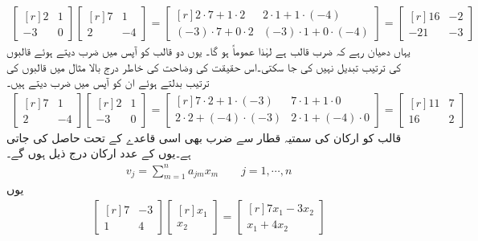 \begin{align*}
\begin{bmatrix*}[r]
2 & 1\\
-3 & 0
\end{bmatrix*}
\begin{bmatrix*}[r]
7 &1\\
2&-4
\end{bmatrix*}=
\begin{bmatrix*}[r]
2\cdot 7+1\cdot 2& 2 \cdot 1+1\cdot(-4)\\
(-3)\cdot 7+0\cdot 2& (-3)\cdot 1+0\cdot(-4)
\end{bmatrix*}=
\begin{bmatrix*}[r]
16&-2\\
-21&-3
\end{bmatrix*}
\end{align*}
یہاں دھیان رہے  کہ ضرب قالب  ہے لہٰذا  عموماً  ہو گا۔ یوں دو قالب کو آپس میں ضرب دیتے ہوئے  قالبوں کی ترتیب تبدیل نہیں کی جا سکتی۔اس حقیقت کی وضاحت کی خاطر درج بالا مثال میں قالبوں کی ترتیب بدلتے ہوئے ان کو آپس میں ضرب  دیتے ہیں۔
\begin{align*}
\begin{bmatrix*}[r]
7 & 1\\
2 & -4
\end{bmatrix*}
\begin{bmatrix*}[r]
2&1\\
-3&0
\end{bmatrix*}=
\begin{bmatrix*}[r]
7\cdot 2+1\cdot(-3)& 7\cdot 1+1\cdot 0\\
2\cdot 2+(-4)\cdot (-3)& 2\cdot 1 +(-4)\cdot 0
\end{bmatrix*}=
\begin{bmatrix*}[r]
11& 7\\
16 &2
\end{bmatrix*}
\end{align*}
 قالب  کو  ارکان کی سمتیہ قطار  سے ضرب بھی اسی قاعدے کے تحت حاصل کی جاتی ہے۔یوں  کے  عدد ارکان درج ذیل ہوں گے۔
\begin{align}
v_j=\sum_{m=1}^{n} a_{jm}x_{m} \quad \quad j=1,\cdots, n
\end{align}
یوں
\begin{align*}
\begin{bmatrix*}[r]
7 & -3\\
1 & 4
\end{bmatrix*}
\begin{bmatrix*}[r]
x_1\\
x_2
\end{bmatrix*}=
\begin{bmatrix*}[r]
7x_1-3x_2\\
x_1+4x_2
\end{bmatrix*}
\end{align*}
